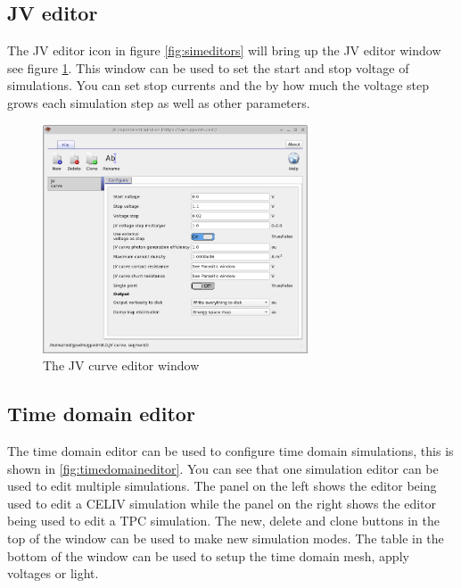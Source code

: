 \subsection{JV editor}
The JV editor icon in figure \ref{fig:simeditors} will bring up the JV editor window see figure \ref{fig:jvcurveeditor}. This window can be used to set the start and stop voltage of simulations. You can set stop currents and the by how much the voltage step grows each simulation step as well as other parameters.

\begin{figure}[H]
\centering
\includegraphics[width=0.7\textwidth,height=0.5\textwidth]{./images/jv_editor.png}
\caption{The JV curve editor window}
\label{fig:jvcurveeditor}
\end{figure}

\subsection{Time domain editor}
The time domain editor can be used to configure time domain simulations, this is shown in \ref{fig:timedomaineditor}.  You can see that one simulation editor can be used to edit multiple simulations.  The panel on the left shows the editor being used to edit a CELIV simulation while the panel on the right shows the editor being used to edit a TPC simulation.  The new, delete and clone buttons in the top of the window can be used to make new simulation modes. The table in the bottom of the window can be used to setup the time domain mesh, apply voltages or light.

